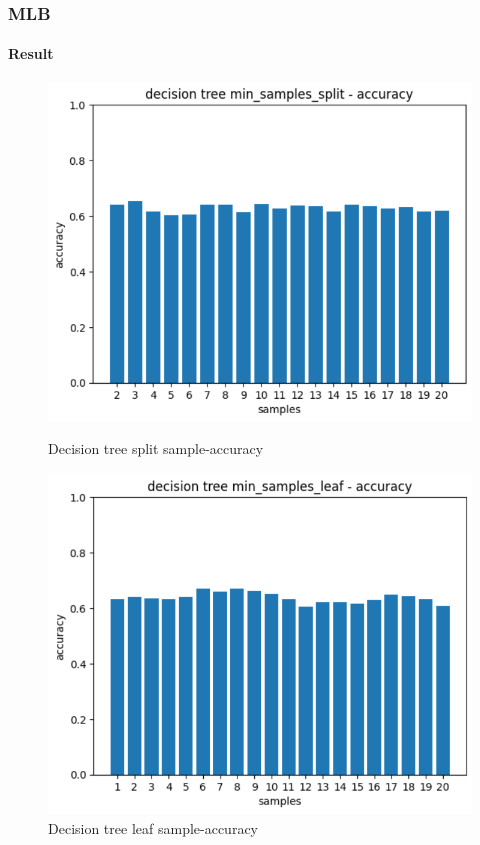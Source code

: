 \documentclass[
	11pt, %
	aspectratio=169, %
]{beamer}
\begin{document}
\begin{frame}
	\frametitle{MLB}
	\framesubtitle{Result}

	\begin{figure}[htbp]
		\begin{minipage}[t]{0.48\textwidth}
			\includegraphics[width=1.0\linewidth]{decision_tree_split.png}
			\caption{Decision tree split sample-accuracy}
		\end{minipage}
		\begin{minipage}[t]{0.48\textwidth}
			\includegraphics[width=1.0\linewidth]{decision_tree_leaf.png}
			\caption{Decision tree leaf sample-accuracy}
		\end{minipage}
	\end{figure}
\end{frame}
\end{document}
